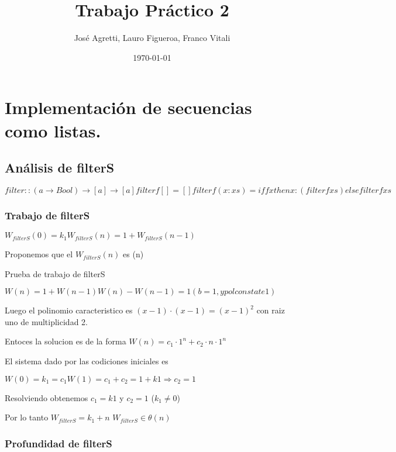 \documentclass[a4paper,12pt]{article}
\newcommand{\bec}[1]{\begin{center}#1\end{center}}
\begin{document}
\title{Trabajo Práctico 2}
\author{José Agretti, Lauro Figueroa, Franco Vitali}
\date{\today}
\maketitle

\newpage

\section{Implementación de secuencias como listas.}

\subsection{Análisis de filterS}

\begin{math} 
    filter :: (a \rightarrow Bool) \rightarrow [a] \rightarrow [a] 

    filter f [] = [] 

    filter f (x:xs) = if f x then x : (filter f xs) else filter f xs
\end{math}


\subsubsection{Trabajo de filterS}


\begin{math}
    W_{filterS} (0) = k_1

    W_{filterS} (n) = 1 + W_{filterS} (n-1) 
\end{math}


Proponemos que el $W_{filterS}(n)$ es \theta(n) 

\bec{Prueba de trabajo de filterS}

\begin{math}
    W(n) = 1 + W(n-1)

    W(n) - W(n-1) = 1 (b = 1, y pol constate 1)
\end{math}{}

    Luego el polinomio caracteristico es $(x - 1) \cdot (x - 1) = (x - 1)^2$ con raiz 
    uno de multiplicidad 2.

    Entoces la solucion es de la forma $W(n) = c_1 \cdot 1^n + c_2 \cdot n \cdot 1^n$

    El sistema dado por las codiciones iniciales es

    \begin{math}
        W(0) = k_1 = c_1

        W(1) = c_1 + c_2 = 1 + k1 \Rightarrow c_2 = 1
    \end{math}
    
    Resolviendo obtenemos $c_1 = k1$ y $c_2 = 1$ ($k_1 \neq 0$)

    Por lo tanto $W_{filterS} = k_1 + n$ \Rightarrow $W_{filterS} \in \theta(n)$


\subsubsection{Profundidad de filterS}
\end{document}
